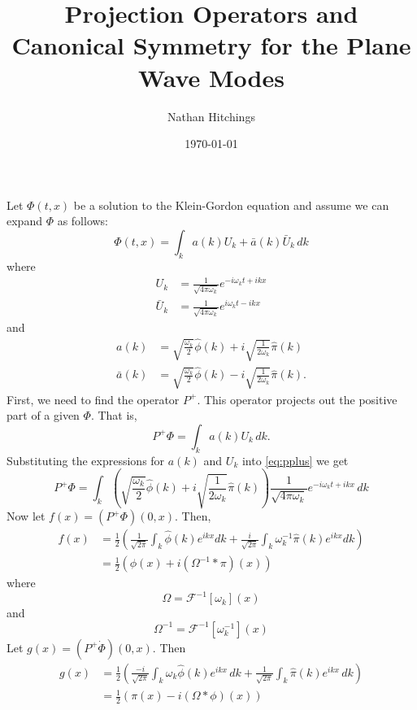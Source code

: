 \documentclass[12pt,oneside]{article}
\title{Projection Operators and Canonical Symmetry for the Plane Wave Modes}
\date{\today}
\author{Nathan Hitchings}
\begin{document}
\maketitle
Let $\Phi(t,x)$ be a solution to the Klein-Gordon equation and assume
we can expand $\Phi$ as follows:
\begin{equation}
  \Phi(t,x)=\int_ka(k)U_k+\bar{a}(k)\bar{U}_k\, dk
\end{equation}
where 
\begin{align}
  U_k&=\frac{1}{\sqrt{4\pi\omega_k}}e^{-i\omega_kt+ikx}\\
  \bar{U}_k&=\frac{1}{\sqrt{4\pi\omega_k}}e^{i\omega_kt-ikx}
\end{align}
and 
\begin{align}
  a(k)&=\sqrt{\frac{\omega_k}{2}}\hat{\phi}(k)+i\sqrt{\frac{1}{2\omega_k}}\hat{\pi}(k)\\
  \bar{a}(k)&=\sqrt{\frac{\omega_k}{2}}\hat{\phi}(k)-i\sqrt{\frac{1}{2\omega_k}}\hat{\pi}(k).
\end{align}
First, we need to find the operator $P^+$. This operator projects out the
positive part of a given $\Phi$. That is,
\begin{equation}\label{eq:pplus}
  P^+\Phi=\int_ka(k)U_k\, dk.
\end{equation}
Substituting the expressions for $a(k)$ and $U_k$ into
\eqref{eq:pplus} we get 
\begin{equation}
  P^+\Phi=\int_k\left(\sqrt{\frac{\omega_k}{2}}\hat{\phi}(k)+i\sqrt{\frac{1}{2\omega_k}}\hat{\pi}(k)\right)\frac{1}{\sqrt{4\pi\omega_k}}e^{-i\omega_kt+ikx}\,dk  
\end{equation}
Now let $f(x)=(P^+\Phi)(0,x)$. Then, 
\begin{align*}
  f(x)&=\frac{1}{2}\left(\frac{1}{\sqrt{2\pi}}\int_k\hat{\phi}(k)e^{ikx}dk+\frac{i}{\sqrt{2\pi}}\int_k\omega_k^{-1}\hat{\pi}(k)e^{ikx}dk\right)\\
&=\frac{1}{2}\left(\phi(x)+i(\Omega^{-1}*\pi)(x)\right)
\end{align*}
where
\begin{equation}
\Omega=\mathcal{F}^{-1}\left[\omega_k\right](x)
\end{equation}
and
\begin{equation}
  \Omega^{-1}=\mathcal{F}^{-1}\left[\omega_k^{-1}\right](x)
\end{equation}
Let $g(x)=(P^+\dot{\Phi})(0,x)$. Then 
\begin{align*}
  g(x)&=\frac{1}{2}\left(\frac{-i}{\sqrt{2\pi}}\int_k\omega_k\hat{\phi}(k)e^{ikx}\,dk+\frac{1}{\sqrt{2\pi}}\int_k\hat{\pi}(k)e^{ikx}\,dk\right)\\
      &=\frac{1}{2}\left(\pi(x)-i(\Omega*\phi)(x)\right)
\end{align*}
\end{document}
